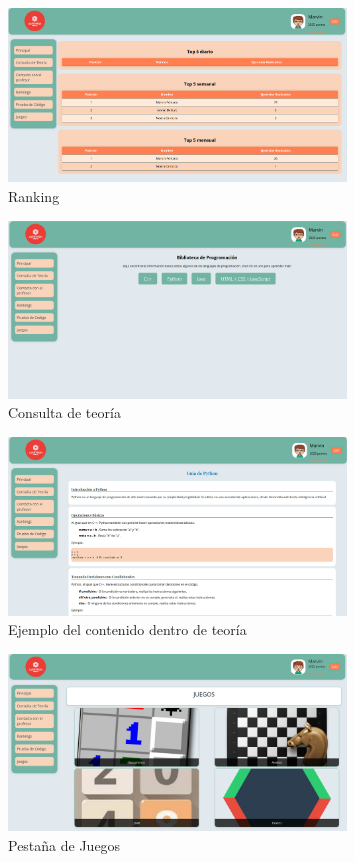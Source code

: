 \begin{appendices}
\begin{figure}[H]
    \centering
    \includegraphics[width=0.8\textwidth]{imagenes/Manual/ranking.png}
    \caption{Ranking}
\end{figure}

\begin{figure}[H]
    \centering
    \includegraphics[width=0.8\textwidth]{imagenes/Manual/biblio.png}
    \caption{Consulta de teoría}
\end{figure}

\begin{figure}[H]
    \centering
    \includegraphics[width=0.8\textwidth]{imagenes/Manual/biblio2.png}
    \caption{Ejemplo del contenido dentro de teoría}
\end{figure}

\begin{figure}[H]
    \centering
    \includegraphics[width=0.8\textwidth]{imagenes/Manual/juegos.png}
    \caption{Pestaña de Juegos}
\end{figure}


\end{appendices}
